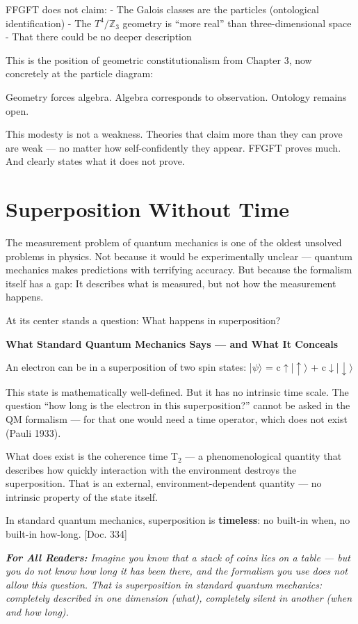 \documentclass[11pt,oneside]{book}
\newenvironment{laierspur}{%
  \par\vspace{4pt}%
  \noindent\small\itshape\color{blue!60!black}%
  \textbf{For All Readers:}\enspace\ignorespaces}{%
  \par\vspace{4pt}\normalsize\normalfont\normalcolor}
\begin{document}
FFGFT does not claim:
- The Galois classes are the particles (ontological identification)
- The $T^4/\mathbb{Z}_3$ geometry is \enquote{more real} than three-dimensional space
- That there could be no deeper description

This is the position of geometric constitutionalism from Chapter 3, now
concretely at the particle diagram:

Geometry forces algebra. Algebra corresponds to observation. Ontology
remains open.

This modesty is not a weakness. Theories that claim more than they can prove
are weak — no matter how self-confidently they appear. FFGFT proves much.
And clearly states what it does not prove.


\chapter{Superposition Without Time}

The measurement problem of quantum mechanics is one of the oldest unsolved
problems in physics. Not because it would be experimentally unclear — quantum
mechanics makes predictions with terrifying accuracy. But because the
formalism itself has a gap: It describes what is measured, but not how the
measurement happens.

At its center stands a question: What happens in superposition?

\textbf{What Standard Quantum Mechanics Says — and What It Conceals}

An electron can be in a superposition of two spin states:
|$\psi\rangle$ = c$\uparrow$|$\uparrow\rangle$ + c$\downarrow$|$\downarrow\rangle$

This state is mathematically well-defined. But it has no intrinsic time
scale. The question \enquote{how long is the electron in this superposition?} cannot
be asked in the QM formalism — for that one would need a time operator,
which does not exist (Pauli 1933).

What does exist is the coherence time T$_2$ — a phenomenological quantity
that describes how quickly interaction with the environment destroys the
superposition. That is an external, environment-dependent quantity — no
intrinsic property of the state itself.

In standard quantum mechanics, superposition is \textbf{timeless}: no built-in
when, no built-in how-long. [Doc. 334]

\begin{laierspur}
Imagine you know that a stack of coins lies on a table — but you do not
know how long it has been there, and the formalism you use does not allow
this question. That is superposition in standard quantum mechanics:
completely described in one dimension (what), completely silent in another
(when and how long).
\end{laierspur}
\end{document}
